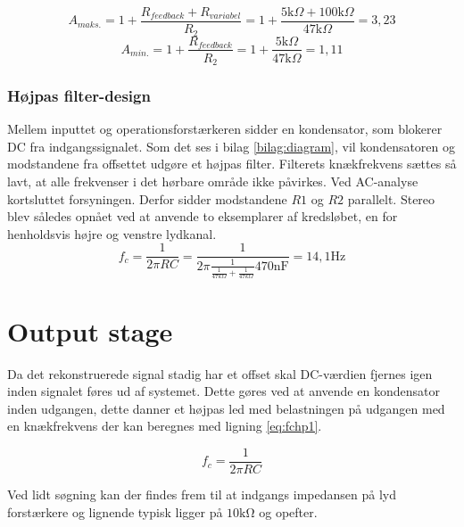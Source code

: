 \begin{equation}
\label{eq:Aminfors}
A_{maks.} = 1 + \frac{R_{feedback} + R_{variabel}}{R_2} = 1 + \frac{5\text{k} \Omega + 100\text{k} \Omega}{47\text{k} \Omega} = 3,23
\end{equation}
\begin{equation}
\label{Amaksfors}
A_{min.} = 1 + \frac{R_{feedback}}{R_2} = 1 + \frac{5\text{k} \Omega}{47\text{k} \Omega} = 1,11
\end{equation}

\subsubsection{Højpas filter-design}
Mellem inputtet og operationsforstærkeren sidder en kondensator, som blokerer DC fra indgangssignalet. 
Som det ses i bilag \ref{bilag:diagram}, vil kondensatoren og modstandene fra offsettet udgøre et højpas filter. 
Filterets knækfrekvens sættes så lavt, at alle frekvenser i det hørbare område ikke påvirkes. 
Ved AC-analyse kortsluttet forsyningen. Derfor sidder modstandene $R1$ og $R2$ parallelt.
Stereo blev således opnået ved at anvende to eksemplarer af kredsløbet, en for henholdsvis højre og venstre lydkanal.
\begin{equation}
f_c = \frac{1}{2\pi R C} = \frac{1}{2 \pi \frac{1}{\frac{1}{47k \Omega}+\frac{1}{47k \Omega}}  470\text{nF}} = 14,1\text{Hz}
\end{equation}

\section{Output stage}

Da det rekonstruerede signal stadig har et offset skal DC-værdien fjernes igen inden signalet føres ud af systemet.
Dette gøres ved at anvende en kondensator inden udgangen, dette danner et højpas led med belastningen på udgangen med en knækfrekvens der kan beregnes med ligning \ref{eq:fchp1}.

\begin{equation}
	f_c = \frac{1}{2\pi RC}
\label{eq:fchp1}
\end{equation}

Ved lidt søgning kan der findes frem til at indgangs impedansen på lyd forstærkere og lignende typisk ligger på $10\si{\kilo\ohm}$ og opefter.

